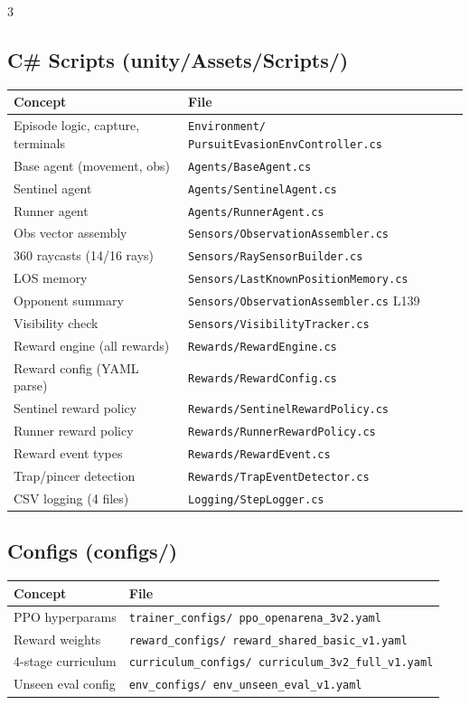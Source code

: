 \documentclass[10pt,landscape,a4paper]{article}
\begin{document}
\begin{multicols}{3}
\subsection{C\# Scripts (unity/Assets/Scripts/)}
\begin{tabular}{@{}p{2.8cm}p{4.8cm}@{}}
\toprule
\textbf{Concept} & \textbf{File} \\
\midrule
Episode logic, capture, terminals & \texttt{Environment/ PursuitEvasionEnvController.cs} \\
Base agent (movement, obs) & \texttt{Agents/BaseAgent.cs} \\
Sentinel agent & \texttt{Agents/SentinelAgent.cs} \\
Runner agent & \texttt{Agents/RunnerAgent.cs} \\
Obs vector assembly & \texttt{Sensors/ObservationAssembler.cs} \\
360 raycasts (14/16 rays) & \texttt{Sensors/RaySensorBuilder.cs} \\
LOS memory & \texttt{Sensors/LastKnownPositionMemory.cs} \\
Opponent summary & \texttt{Sensors/ObservationAssembler.cs} L139 \\
Visibility check & \texttt{Sensors/VisibilityTracker.cs} \\
Reward engine (all rewards) & \texttt{Rewards/RewardEngine.cs} \\
Reward config (YAML parse) & \texttt{Rewards/RewardConfig.cs} \\
Sentinel reward policy & \texttt{Rewards/SentinelRewardPolicy.cs} \\
Runner reward policy & \texttt{Rewards/RunnerRewardPolicy.cs} \\
Reward event types & \texttt{Rewards/RewardEvent.cs} \\
Trap/pincer detection & \texttt{Rewards/TrapEventDetector.cs} \\
CSV logging (4 files) & \texttt{Logging/StepLogger.cs} \\
\bottomrule
\end{tabular}

\subsection{Configs (configs/)}
\begin{tabular}{@{}p{2.8cm}p{4.8cm}@{}}
\toprule
\textbf{Concept} & \textbf{File} \\
\midrule
PPO hyperparams & \texttt{trainer\_configs/ ppo\_openarena\_3v2.yaml} \\
Reward weights & \texttt{reward\_configs/ reward\_shared\_basic\_v1.yaml} \\
4-stage curriculum & \texttt{curriculum\_configs/ curriculum\_3v2\_full\_v1.yaml} \\
Unseen eval config & \texttt{env\_configs/ env\_unseen\_eval\_v1.yaml} \\
\bottomrule
\end{tabular}


\end{multicols}
\end{document}
